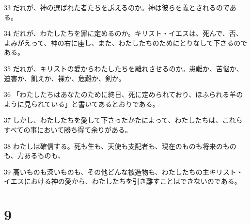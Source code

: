 \par 33 だれが、神の選ばれた者たちを訴えるのか。神は彼らを義とされるのである。
\par 34 だれが、わたしたちを罪に定めるのか。キリスト・イエスは、死んで、否、よみがえって、神の右に座し、また、わたしたちのためにとりなして下さるのである。
\par 35 だれが、キリストの愛からわたしたちを離れさせるのか。患難か、苦悩か、迫害か、飢えか、裸か、危難か、剣か。
\par 36 「わたしたちはあなたのために終日、死に定められており、ほふられる羊のように見られている」と書いてあるとおりである。
\par 37 しかし、わたしたちを愛して下さったかたによって、わたしたちは、これらすべての事において勝ち得て余りがある。
\par 38 わたしは確信する。死も生も、天使も支配者も、現在のものも将来のものも、力あるものも、
\par 39 高いものも深いものも、その他どんな被造物も、わたしたちの主キリスト・イエスにおける神の愛から、わたしたちを引き離すことはできないのである。

\chapter{9}

